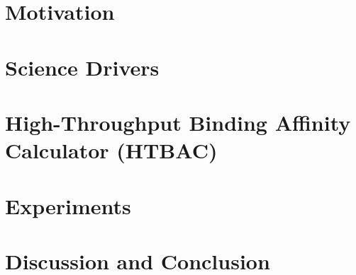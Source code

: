 \documentclass[conference]{IEEEtran}
\begin{document}
\section{Motivation}\label{sec:related-work}



\section{Science Drivers}\label{sec:science-drivers}




\section{High-Throughput Binding Affinity Calculator
(HTBAC)}\label{sec:htbac}



\section{Experiments}\label{sec:experiments}



\section{Discussion and Conclusion}\label{sec:discussion}



%
% 


\end{document}
